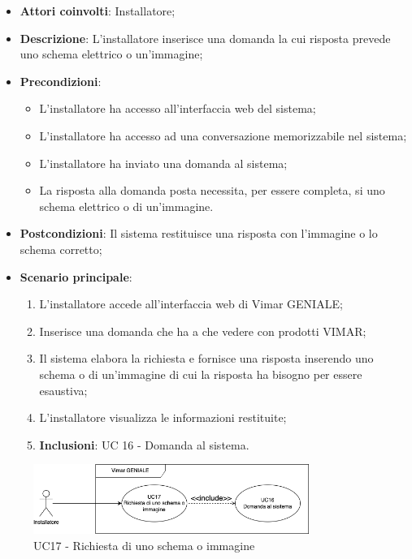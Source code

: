 \begin{itemize}
    \item \textbf{Attori coinvolti}: Installatore;
    \item \textbf{Descrizione}: L’installatore inserisce una domanda la cui risposta prevede uno schema elettrico o un'immagine;
    \item \textbf{Precondizioni}: 
        \begin{itemize}
            \item L’installatore ha accesso all’interfaccia web del sistema;
            \item L’installatore ha accesso ad una conversazione memorizzabile nel sistema;
            \item L'installatore ha inviato una domanda al sistema;
            \item La risposta alla domanda posta necessita, per essere completa, si uno schema elettrico o di un'immagine.
        \end{itemize}
    \item \textbf{Postcondizioni}: Il sistema restituisce una risposta con l'immagine o lo schema corretto;
    \item \textbf{Scenario principale}:
    \begin{enumerate}
    \item L’installatore accede all’interfaccia web di Vimar GENIALE;
    \item Inserisce una domanda che ha a che vedere con prodotti VIMAR;
    \item Il sistema elabora la richiesta e fornisce una risposta inserendo uno schema o di un'immagine di cui la risposta ha bisogno per essere esaustiva;
    \item L’installatore visualizza le informazioni restituite;
    \item \textbf{Inclusioni}: UC 16 - Domanda al sistema.
    \end{enumerate}
\end{itemize}
\begin{figure}[H]
\centering
\includegraphics[width=0.8\textwidth]{contents/casi_duso/png/UC17.png}
\caption{UC17 - Richiesta di uno schema o immagine}
\end{figure}